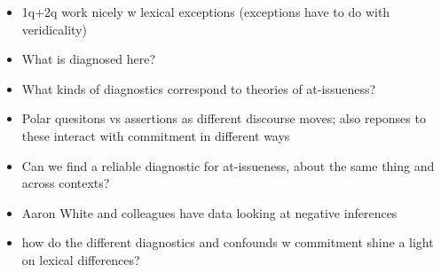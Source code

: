 \documentclass[11pt]{article}
\begin{document}
	\begin{itemize}
		\item 1q+2q work nicely w lexical exceptions (exceptions have to do with veridicality)
		\item What is diagnosed here?
		\item What kinds of diagnostics correspond to theories of at-issueness?
		\item Polar quesitons vs assertions as different discourse moves; also reponses to these interact with commitment in different ways
		\item Can we find a reliable diagnostic for at-issueness, about the same thing and across contexts?
		\item Aaron White and colleagues have data looking at negative inferences
		\item how do the different diagnostics and confounds w commitment shine a light on lexical differences?
	\end{itemize}


\end{document}
